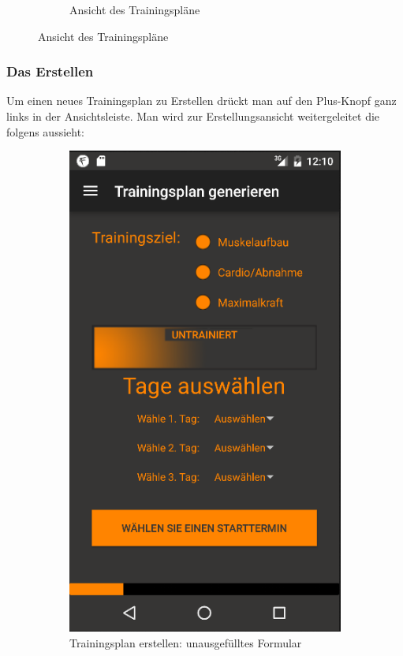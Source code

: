 \documentclass[FIPLY_base.tex]{subfiles}
\begin{document}
\begin{figure}[H]
\begin{subfigure}[b]{0.4\textwidth}
		 		\caption{Ansicht des Trainingspläne}
		 	\end{subfigure}
		 \end{figure}
	\newpage
	\subsubsection{Das Erstellen}
	Um einen neues Trainingsplan zu Erstellen drückt man auf den Plus-Knopf ganz links in der Ansichtsleiste. Man wird zur Erstellungsansicht weitergeleitet die folgens aussieht:
	\begin{figure}[H]
		\begin{subfigure}[b]{0.5\textwidth}
			\includegraphics[scale=0.5]{img/generieren1}
			\caption{Trainingsplan erstellen: unausgefülltes Formular}
		\end{subfigure}
		\begin{subfigure}[b]{0.5\textwidth}

\end{subfigure}
\end{figure}
\end{document}
